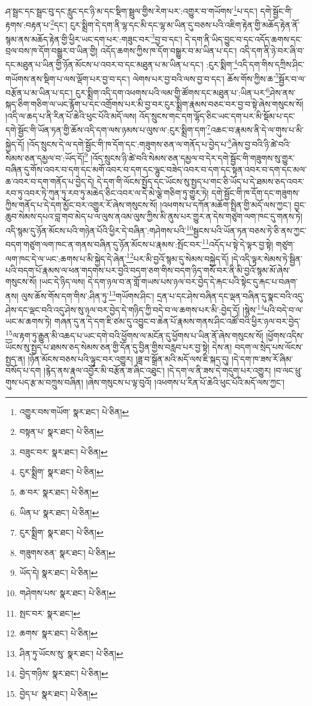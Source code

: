 ཤ་སྦྲང་དང་སྦྲང་བུ་དང་རླུང་དང་ཉི་མ་དང་སྡིག་སྦྲུལ་གྱིས་རེག་པར་:འགྱུར་བ་གཡོགས་\footnote{འགྱུར་བས་གཡོག་  སྣར་ཐང་།  པེ་ཅིན། }པ་དང་། དགེ་སྦྱོང་གི་རྟགས་:བརྟན་པ་\footnote{བསྟན་པ་  སྣར་ཐང་།  པེ་ཅིན། }དང་། ངུར་སྨྲིག་དེ་དག་ནི་ལྷ་དང་མི་དང་ལྷ་མ་ཡིན་དུ་བཅས་པའི་འཇིག་རྟེན་གྱི་མཆོད་རྟེན་ནོ་སྙམ་ནས་མཆོད་རྟེན་གྱི་ཕྱིར་ཡང་དག་པར་:གཟུང་བར་\footnote{བཟུང་བར་  སྣར་ཐང་།  པེ་ཅིན། }བྱ་བ་དང་། དེ་དག་ནི་ཡིད་བྱུང་བ་དང་འདོད་ཆགས་དང་བྲལ་བས་ཁ་དོག་བསྒྱུར་བ་ཡིན་གྱི། འདོད་ཆགས་ཀྱིས་ཁ་དོག་བསྒྱུར་བ་མ་ཡིན་པ་དང་། འདི་དག་ནི་ཉེ་བར་ཞི་བ་དང་མཐུན་པ་ཡིན་གྱི་ཉོན་མོངས་པ་འབར་བ་དང་མཐུན་པ་མ་ཡིན་པ་དང་། :ངུར་སྨིག་\footnote{ངུར་སྨྲིག་  སྣར་ཐང་།  པེ་ཅིན། }འདི་དག་གིས་དཀྲིས་ཤིང་གཡོགས་ནས་སྡིག་པ་ལས་ལྡོག་པར་བྱ་བ་དང་། ལེགས་པར་བྱ་བའི་ལས་བྱ་བ་དང་། ཆོས་གོས་ཀྱིས་ཆ་\footnote{ཆ་བར་  སྣར་ཐང་།  པེ་ཅིན། }སྦྱོར་བ་ལ་བརྩོན་པ་མ་ཡིན་པ་དང་། ངུར་སྨྲིག་འདི་དག་འཕགས་པའི་ལམ་གྱི་ཚོགས་དང་མཐུན་པ་:ཡིན་པར་\footnote{ཡིན་པ་  སྣར་ཐང་།  པེ་ཅིན། }ཤེས་ནས་སྐད་ཅིག་གཅིག་ལ་ཡང་རྙོག་པ་དང་འགྲོགས་པར་མི་བྱ་བར་ངུར་སྨྲིག་རྣམས་བཅང་བར་བྱ་བ་སྟེ་ཞེས་གསུངས་སོ། །འདི་ལ་ཆད་པ་ནི་རིན་པོ་ཆེའི་ཕུང་པོའི་མདོ་ལས། འོད་སྲུངས་གང་དག་ལྷོད་ཅིང་ཡང་དག་པར་མི་སྡོམ་པ་དང་དགེ་སྦྱོང་གི་ཡོན་ཏན་གྱི་ཆོས་འདི་དག་ལས་ཉམས་པ་ལུས་ལ་:ངུར་སྨྲིག་དག་\footnote{ངུར་སྨྲིག་  སྣར་ཐང་།  པེ་ཅིན། }འཆང་བ་རྣམས་ནི་དེ་ལ་གུས་པ་མི་སྐྱེད་དོ། །འོད་སྲུངས་དེ་ལ་དགེ་སྦྱོང་གི་ཁ་དོག་དང་:གཟུགས་ཅན་ལ་གནོད་པ་བྱེད་པ་\footnote{གཟུགས་ཅན་  སྣར་ཐང་།  པེ་ཅིན། }ཞེས་བྱ་བའི་ཉི་ཚེ་བའི་སེམས་ཅན་དམྱལ་བ་:ཡོད་དོ།\footnote{ཡོད་དེ།  སྣར་ཐང་།  པེ་ཅིན། } །འོད་སྲུངས་ཉི་ཚེ་བའི་སེམས་ཅན་དམྱལ་བ་དེར་དགེ་སྦྱོང་གི་གཟུགས་སུ་གྱུར་བཞིན་དུ་གོས་འབར་བ་དག་དང་མགོ་འབར་བ་དག་དང་ལྷུང་བཟེད་འབར་བ་དག་དང་སྟན་འབར་བ་དག་དང་མལ་ཆ་འབར་བ་དག་གནོད་པ་བྱེད་དེ། དེ་དག་གི་ལོངས་སྤྱོད་དང་ཡོངས་སུ་སྤྱད་པ་གང་ཅི་ཡོད་པ་དེ་ཐམས་ཅད་འབར་རབ་ཏུ་འབར་ཏེ་ཀུན་ཏུ་རབ་ཏུ་མཆེད་ཅིང་འབར་ལ་དེ་མེ་ལྕེ་གཅིག་ཏུ་གྱུར་ཏེ། དགེ་སྦྱོང་གི་ཁ་དོག་དང་གཟུགས་ཀྱིས་གནོད་པ་དེ་དག་མྱོང་བར་འགྱུར་རོ་ཞེས་གསུངས་སོ། །འཕགས་པ་དཀོན་མཆོག་སྤྲིན་གྱི་མདོ་ལས་ཀྱང་། བྱང་ཆུབ་སེམས་དཔའ་བླ་གབ་མེད་པ་ལ་ལུས་ནའམ་ལུས་ཀྱིས་མི་ནུས་པར་གྱུར་ན་དེས་གཙུག་ལག་ཁང་དུ་གནས་ཏེ། འདི་སྙམ་དུ་ཉོན་མོངས་པའི་གཉེན་པོའི་ཕྱིར་དེ་བཞིན་:གཤེགས་པའི་\footnote{གཤེགས་པས་  སྣར་ཐང་།  པེ་ཅིན། }སྦྱངས་པའི་ཡོན་ཏན་བཅས་ཏེ་ཅི་ནས་ཀྱང་བདག་གཙུག་ལག་ཁང་ན་གནས་བཞིན་དུ་ཉོན་མོངས་པ་རྣམས་:སྤོང་བར་\footnote{སྤང་བར་  སྣར་ཐང་། }འདོད་པ་སྟེ་དེ་ལྟར་བྱ་སྟེ། གཙུག་ལག་ཁང་དེ་ལ་ཡང་:ཆགས་པ་མི་སྐྱེད་དེ་ཞེན་\footnote{ཆགས་  སྣར་ཐང་།  པེ་ཅིན། }པར་མི་བྱའོ་སྙམ་དུ་སེམས་བསྐྱེད་དོ། །དེ་འདི་ལྟར་སེམས་ཏེ་སྦྱིན་པའི་བདག་པོ་རྣམས་ལ་ཕན་གདགས་པར་བྱའི་བདག་ཅག་གིས་བདག་ཉིད་གསོ་བར་ནི་མི་བྱའོ་སྙམ་མོ་ཞེས་གསུངས་སོ། །ཡང་དེ་ཉིད་ལས། དེ་དག་ཉལ་བ་ན་གློ་གཡས་པས་ཉལ་བར་བྱེད་དེ་རྐང་པའི་སྟེང་དུ་རྐང་པ་བཞག་ནས། ལུས་ཆོས་གོས་དག་གིས་:ཤིན་ཏུ་\footnote{ཤིན་ཏུ་ཡོངས་སུ་  སྣར་ཐང་།  པེ་ཅིན། }གཡོགས་ཤིང་། དྲན་པ་དང་ཤེས་བཞིན་དང་ལྡན་བཞིན་དུ་སྣང་བའི་འདུ་ཤེས་དང་ལྡང་བའི་འདུ་ཤེས་སུ་ཉལ་བར་བྱེད་དེ་གཉིད་ཀྱི་བདེ་བ་ལ་ཆགས་པར་མི་:བྱེད་དོ། །སྙེས་\footnote{བྱེད་གཉིས་  སྣར་ཐང་།  པེ་ཅིན། }པའི་བདེ་བ་ལ་ཡང་མ་ཆགས་ཏེ། གཞན་དུ་ན་དེ་དག་ཇི་ཙམ་དུ་འབྱུང་བ་ཆེན་པོ་རྣམས་གནས་ཤིང་འཚོ་བའི་ཕྱིར་ཉལ་བར་བྱེད་\footnote{བྱེད་པ་  སྣར་ཐང་།  པེ་ཅིན། }ལ་རྟག་ཏུ་རྒྱུན་མི་འཆད་པ་ཡང་དགེ་བའི་ཕྱོགས་ལ་མངོན་དུ་ཕྱོགས་པ་ཡིན་ནོ་ཞེས་གསུངས་སོ། །ཕྱོགས་འདིས་ཡོངས་སུ་སྤྱད་པ་ཐམས་ཅད་སེམས་ཅན་གྱི་དོན་དུ་བྱིན་གྱིས་བརླབ་པར་བྱ་སྟེ། དེས་ན། བདག་ལ་སྲེད་པས་ལོངས་སྤྱད་ན། །ཉོན་མོངས་བཅས་པའི་ལྟུང་བར་འགྱུར། །ཟླ་བ་སྒྲོན་མའི་མདོ་ལས་ཇི་སྐད་དུ། །དེ་དག་ཁ་ཟས་རོ་ཞིམ་བསོད་པ་དག །རྙེད་ནས་རྣལ་འབྱོར་མི་བརྩོན་ཟ་ཞིང་འཐུང་། །དེ་དག་ལ་ནི་ཟས་དེ་གདུག་པར་འགྱུར། །བ་ལང་ཕྲུ་གུས་པད་རྩ་མ་བཀྲུས་བཞིན། །ཞེས་གསུངས་པ་ལྟ་བུའོ། །འཕགས་པ་རིན་པོ་ཆེའི་ཕུང་པོའི་མདོ་ལས་ཀྱང་། 